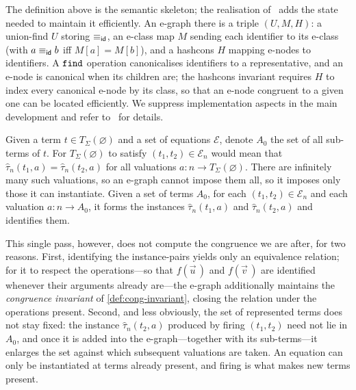 \begin{remark}[Implementation]
\label{rem:egraph-impl}
The definition above is the semantic skeleton; the realisation
of~\cite{EggPaper} adds the state needed to maintain it efficiently. An
e-graph there is a triple $(U, M, H)$: a union-find $U$ storing
$\equiv_{\sf id}$, an e-class map $M$ sending each identifier to its e-class
(with $a \equiv_{\sf id} b$ iff $M[a] = M[b]$), and a hashcons $H$ mapping
e-nodes to identifiers. A $\texttt{find}$ operation canonicalises identifiers
to a representative, and an e-node is canonical when its children are;
the hashcons invariant requires $H$ to index every canonical e-node by
its class, so that an e-node congruent to a given one can be located efficiently.
We suppress implementation aspects in
the main development and refer to~\cite{EggPaper} for details.
\end{remark}

Given a term $t \in T_\Sigma(\varnothing)$ and a set of equations
$\mathcal{E}$, denote $A_0$ the set of all sub-terms of $t$.
For $T_\Sigma(\varnothing)$ to satisfy $(t_1, t_2) \in \mathcal{E}_n$ would
mean that $\hat{\tau}_n(t_1, a) = \hat{\tau}_n(t_2, a)$ for all
valuations $a : n \to T_\Sigma(\varnothing)$.
There are infinitely many such valuations, so an e-graph cannot impose them all, so it imposes only those it can instantiate.
Given a set of terms $A_0$, for
each $(t_1, t_2) \in \mathcal{E}_n$ and each valuation $a : n \to A_0$,
it forms the instances $\hat{\tau}_n(t_1, a)$ and $\hat{\tau}_n(t_2, a)$
and identifies them.

This single pass, however, does not compute the congruence we are after,
for two reasons. First, identifying the instance-pairs yields only an
equivalence relation; for it to respect the operations---so that
$f(\vec u\,)$ and $f(\vec v\,)$ are identified whenever their arguments
already are---the e-graph additionally maintains the \emph{congruence
invariant} of \cref{def:cong-invariant}, closing the relation under the
operations present. Second, and less obviously, the set of represented
terms does not stay fixed: the instance $\hat{\tau}_n(t_2, a)$ produced
by firing $(t_1, t_2)$ need not lie in $A_0$, and once it is added into the e-graph---together
with its sub-terms---it enlarges the set against which subsequent valuations
are taken. An equation can only be instantiated at terms already
present, and firing is what makes new terms present.

